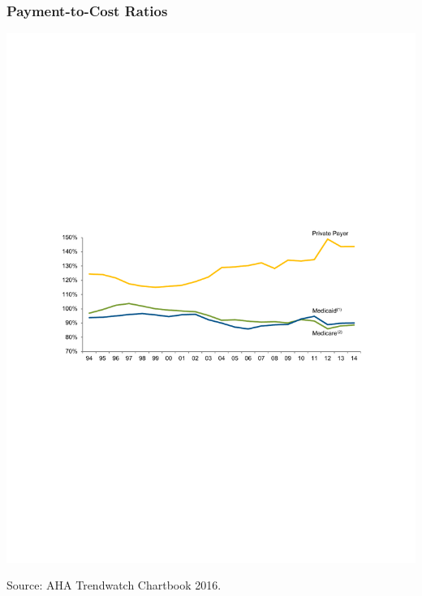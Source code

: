 \documentclass[ucs,9pt]{beamer}
\begin{document}
\begin{frame}
\frametitle{Payment-to-Cost Ratios}
\begin{center}
\includegraphics[scale=0.7]{4_6}
\end{center}
\tiny Source: AHA Trendwatch Chartbook 2016.  
\end{frame}
\end{document}
